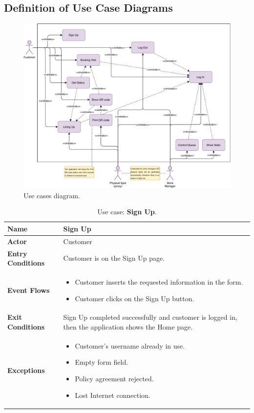 \subsection{Definition of Use Case Diagrams}


\begin{figure}[H]
	\centering
	\includegraphics[width=1.0\textwidth]{images/use_cases_diagram.pdf}
	\caption{Use cases diagram.}
\end{figure}

\begin{table}[H]
\centering
\begin{tabular}{| m{} | m{} |} 
	\hline
	\textbf{Name} & Sign Up \\ 
	\hline
	\textbf{Actor} & Customer \\ 
	\hline
	\textbf{Entry Conditions} & Customer is on the Sign Up page. \\ 
	\hline
	\textbf{Event Flows} &
	\begin{itemize}
		\item Customer inserts the requested information in the form.
		\item Customer clicks on the Sign Up button.
	\end{itemize} \\ 
	\hline
	\textbf{Exit Conditions} & Sign Up completed successfully and customer is logged in, then the application shows the Home page. \\ 
	\hline
	\textbf{Exceptions} &
	\begin{itemize}
		\item Customer's username already in use.
		\item Empty form field.
		\item Policy agreement rejected.
		\item Lost Internet connection.
	\end{itemize} \\ 
	\hline
\end{tabular}
\caption{Use case: \textbf{Sign Up}.}
\label{tableSignUp}
\end{table}

